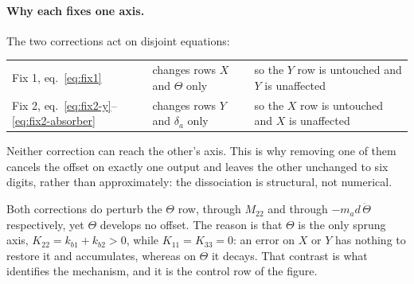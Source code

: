 \paragraph{Why each fixes one axis.} The two corrections act on disjoint equations:
%
\begin{center}
\begin{tabular}{@{}lll@{}}
  Fix 1, eq.~\eqref{eq:fix1} & changes rows $X$ and $\Theta$ only
    & so the $Y$ row is untouched and $Y$ is unaffected \\
  Fix 2, eq.~\eqref{eq:fix2-y}--\eqref{eq:fix2-absorber} & changes rows $Y$ and $\delta_a$ only
    & so the $X$ row is untouched and $X$ is unaffected \\
\end{tabular}
\end{center}
%
Neither correction can reach the other's axis. This is why removing one of them cancels the
offset on exactly one output and leaves the other unchanged to six digits, rather than
approximately: the dissociation is structural, not numerical.

Both corrections do perturb the $\Theta$ row, through $M_{22}$ and through
$-m_a d\,\ddot\Theta$ respectively, yet $\Theta$ develops no offset. The reason is that $\Theta$
is the only sprung axis, $K_{22} = k_{b1}{+}k_{b2} > 0$, while $K_{11} = K_{33} = 0$: an error
on $X$ or $Y$ has nothing to restore it and accumulates, whereas on $\Theta$ it decays. That
contrast is what identifies the mechanism, and it is the control row of the figure.

